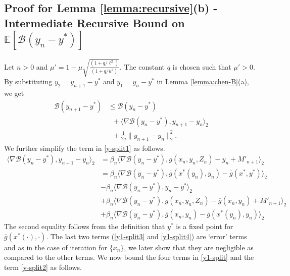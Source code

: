 \documentclass[letterpaper, 10 pt, conference]{ieeeconf}  %
\theoremstyle{definition}
\theoremstyle{plain}
\newcommand{\barg}{\overline{g}}
\newcommand{\xstar}{x^*}
\newcommand{\ystar}{y^*}
\newcommand{\EE}{\mathbb{E}}
\newcommand{\Bcal}{\mathcal{B}}
\begin{document}
\subsection{\textbf{Proof for Lemma \ref{lemma:recursive}(b) - Intermediate Recursive Bound on $\EE[\Bcal(y_n-\ystar)]$}}
Let $n>0$ and $\mu'=1-\mu\sqrt{\frac{(1+q/\ell^2)}{(1+q/u^2)}}$. The constant $q$ is chosen such that $\mu'>0$.
By substituting $y_2=y_{n+1}-\ystar$ and $y_1=y_n-\ystar$ in Lemma \ref{lemma:chen-B}(a), we get   
\begin{subequations}\label{y-split}
\begin{align}
    \Bcal(y_{n+1}-\ystar)&\leq \Bcal(y_{n}-\ystar)\nonumber\\
    &\;\;+\langle\nabla \Bcal(y_n-\ystar),y_{n+1}-y_n\rangle_2\label{y-split1}\\
    &\;\;+\frac{1}{2q}\|y_{n+1}-y_n\|_2^2.\label{y-split2}
\end{align}
\end{subequations}
We further simplify the term in \eqref{y-split1} as follows.
\begin{subequations}\label{y1-split}
\begin{align}
    \langle\nabla \Bcal(y_n-\ystar),y_{n+1}-y_n\rangle_2&=\beta_n\langle\nabla \Bcal(y_n-\ystar),g(x_n,y_n,Z_n)-y_n+M'_{n+1}\rangle_2\nonumber\\
    &=\beta_n\langle\nabla \Bcal(y_n-\ystar),\barg(\xstar(y_n),y_n)-\barg(\xstar,\ystar)\rangle_2\label{y1-split1}\\
    &-\beta_n\langle\nabla \Bcal(y_n-\ystar),y_n-\ystar\rangle_2\label{y1-split2}\\
    &+\beta_n\langle\nabla \Bcal(y_n-\ystar),g(x_n,y_n,Z_n)-\barg(x_n,y_n)+M'_{n+1}\rangle_2\label{y1-split3}\\
    &+\beta_n\langle\nabla \Bcal(y_n-\ystar),\barg(x_n,y_n)-\barg(\xstar(y_n),y_n)\rangle_2\label{y1-split4}
\end{align}
\end{subequations}
The second equality follows from the definition that $\ystar$ is a fixed point for $\barg(x^*(\cdot),\cdot)$. The last two terms (\eqref{y1-split3} and \eqref{y1-split4}) are `error' terms and as in the case of iteration for $\{x_n\}$, we later show that they are negligible as compared to the other terms. We now bound the four terms in \eqref{y1-split} and the term \eqref{y-split2} as follows.
\end{document}
